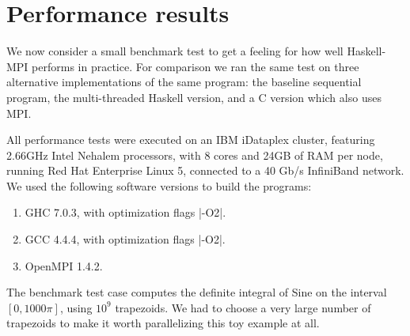 \documentclass{tmr}
\begin{document}
\section{Performance results}

We now consider a small benchmark test to get a feeling for how well Haskell-MPI performs
in practice. For comparison we ran the same test on three alternative implementations
of the same program: the baseline sequential program,
the multi-threaded Haskell version, and a C version which also uses MPI.

All performance tests were executed on an IBM iDataplex cluster,
featuring 2.66GHz Intel Nehalem processors, with 8 cores and
24GB of RAM per node, running Red Hat Enterprise Linux 5, connected
to a 40 Gb/s InfiniBand network. We used the following software
versions to build the programs:
\begin{enumerate}
   \item GHC 7.0.3, with optimization flags |-O2|.
   \item GCC 4.4.4, with optimization flags |-O2|.
   \item OpenMPI 1.4.2.
\end{enumerate}

The benchmark test case computes the definite integral of Sine
on the interval $[0,1000\pi]$, using $10^9$ trapezoids.
We had to choose a very large number of trapezoids to
make it worth parallelizing this toy example at all.



\end{document}
